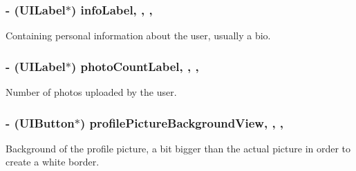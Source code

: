 \subsubsection[{info\+Label}]{\setlength{\rightskip}{0pt plus 5cm}-\/ (U\+I\+Label$\ast$) info\+Label\hspace{0.3cm}{\ttfamily [read]}, {\ttfamily [write]}, {\ttfamily [nonatomic]}, {\ttfamily [strong]}}\label{interface_e_s_account_view_controller_a82b57173e362024e4bcc76e91ab0d18c}
Containing personal information about the user, usually a bio. \hypertarget{interface_e_s_account_view_controller_a080c2273f8f89aa0eae603f86eb527d2}{}
\subsubsection[{photo\+Count\+Label}]{\setlength{\rightskip}{0pt plus 5cm}-\/ (U\+I\+Label$\ast$) photo\+Count\+Label\hspace{0.3cm}{\ttfamily [read]}, {\ttfamily [write]}, {\ttfamily [nonatomic]}, {\ttfamily [strong]}}\label{interface_e_s_account_view_controller_a080c2273f8f89aa0eae603f86eb527d2}
Number of photos uploaded by the user. \hypertarget{interface_e_s_account_view_controller_a35c528afde16fc7fa17fb5bf890a822e}{}
\subsubsection[{profile\+Picture\+Background\+View}]{\setlength{\rightskip}{0pt plus 5cm}-\/ (U\+I\+Button$\ast$) profile\+Picture\+Background\+View\hspace{0.3cm}{\ttfamily [read]}, {\ttfamily [write]}, {\ttfamily [nonatomic]}, {\ttfamily [strong]}}\label{interface_e_s_account_view_controller_a35c528afde16fc7fa17fb5bf890a822e}
Background of the profile picture, a bit bigger than the actual picture in order to create a white border. \hypertarget{interface_e_s_account_view_controller_ab114efbbc510453ce53da7d275ec3c39}{}
